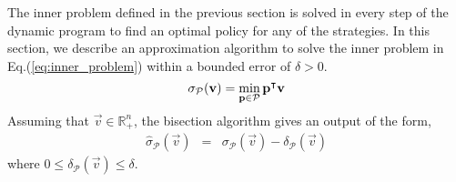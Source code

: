 The inner problem defined in the previous section is solved in every step of the dynamic program to find an optimal policy for any of the strategies. In this section, we describe an approximation algorithm to solve the inner problem in Eq.(\ref{eq:inner_problem}) within a bounded error of $\delta > 0$.
\begin{equation}
\sigma_{\mathcal{P}}(\mathbf{v}) = \min_{\mathbf{p} \in \mathcal{P}} \mathbf{p}^\intercal\mathbf{v}
\label{eq:inner_problem}
\end{equation}
Assuming that $\vec{v} \in \mathbb{R}^n_+$, the bisection algorithm gives an output of the form,
\begin{eqnarray}
\hat{\sigma}_{\mathcal{P}} (\vec{v}) &=& \sigma_{\mathcal{P}} (\vec{v}) - \delta_{\mathcal{P}}(\vec{v})
\end{eqnarray} 
where $0 \leq \delta_{\mathcal{P}}(\vec{v}) \leq \delta$.

